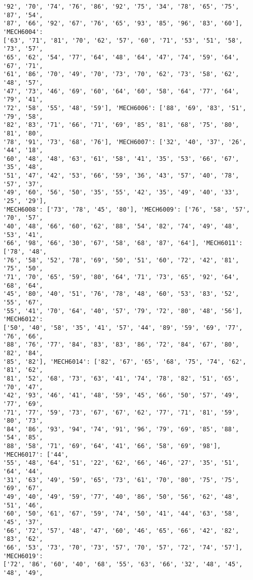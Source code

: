 \documentclass[11pt]{article}
\begin{document}
\begin{Verbatim}[commandchars=\\\{\}]
'92', '70', '74', '76', '86', '92', '75', '34', '78', '65', '75', '87', '54',
'87', '66', '92', '67', '76', '65', '93', '85', '96', '83', '60'], 'MECH6004':
['63', '71', '81', '70', '62', '57', '60', '71', '53', '51', '58', '73', '57',
'65', '62', '54', '77', '64', '48', '64', '47', '74', '59', '64', '67', '71',
'61', '86', '70', '49', '70', '73', '70', '62', '73', '58', '62', '48', '57',
'47', '73', '46', '69', '60', '64', '60', '58', '64', '77', '64', '79', '41',
'72', '58', '55', '48', '59'], 'MECH6006': ['88', '69', '83', '51', '79', '58',
'82', '83', '71', '66', '71', '69', '85', '81', '68', '75', '80', '81', '80',
'78', '91', '73', '68', '76'], 'MECH6007': ['32', '40', '37', '26', '44', '18',
'60', '48', '48', '63', '61', '58', '41', '35', '53', '66', '67', '35', '48',
'51', '47', '42', '53', '66', '59', '36', '43', '57', '40', '78', '57', '37',
'49', '60', '56', '50', '35', '55', '42', '35', '49', '40', '33', '25', '29'],
'MECH6008': ['73', '78', '45', '80'], 'MECH6009': ['76', '58', '57', '70', '57',
'40', '48', '66', '60', '62', '88', '54', '82', '74', '49', '48', '53', '41',
'66', '98', '66', '30', '67', '58', '68', '87', '64'], 'MECH6011': ['78', '48',
'76', '58', '52', '78', '69', '50', '51', '60', '72', '42', '81', '75', '50',
'71', '70', '65', '59', '80', '64', '71', '73', '65', '92', '64', '68', '64',
'45', '80', '40', '51', '76', '78', '48', '60', '53', '83', '52', '55', '67',
'55', '41', '70', '64', '40', '57', '79', '72', '80', '48', '56'], 'MECH6012':
['50', '40', '58', '35', '41', '57', '44', '89', '59', '69', '77', '76', '66',
'88', '76', '77', '84', '83', '83', '86', '72', '84', '67', '80', '82', '84',
'85', '82'], 'MECH6014': ['82', '67', '65', '68', '75', '74', '62', '81', '62',
'81', '52', '68', '73', '63', '41', '74', '78', '82', '51', '65', '70', '47',
'42', '93', '46', '41', '48', '59', '45', '66', '50', '57', '49', '77', '69',
'71', '77', '59', '73', '67', '67', '62', '77', '71', '81', '59', '80', '73',
'84', '86', '93', '94', '74', '91', '96', '79', '69', '85', '88', '54', '85',
'88', '58', '71', '69', '64', '41', '66', '58', '69', '98'], 'MECH6017': ['44',
'55', '48', '64', '51', '22', '62', '66', '46', '27', '35', '51', '64', '44',
'31', '63', '49', '59', '65', '73', '61', '70', '80', '75', '75', '69', '67',
'49', '40', '49', '59', '77', '40', '86', '50', '56', '62', '48', '51', '46',
'60', '50', '61', '67', '59', '74', '50', '41', '44', '63', '58', '45', '37',
'66', '72', '57', '48', '47', '60', '46', '65', '66', '42', '82', '83', '62',
'66', '53', '73', '70', '73', '57', '70', '57', '72', '74', '57'], 'MECH6019':
['72', '86', '60', '40', '68', '55', '63', '66', '32', '48', '45', '48', '49',

\end{Verbatim}
\end{document}
